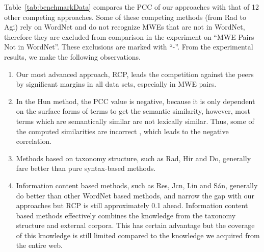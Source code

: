 Table~\ref{tab:benchmarkData} compares the PCC of our approaches with that of 12 other competing approaches.
Some of these competing methods (from Rad to Agi) rely on WordNet and
do not recognize MWEs that are not in WordNet, therefore they are
excluded from comparison in the experiment on ``MWE Pairs Not in WordNet''.
These exclusions are marked with ``-''.
From the experimental results, we make the following observations.
\begin{enumerate}
\item Our most advanced approach, RCP, leads the competition
against the peers by significant margins in all data sets,
especially in MWE pairs.
\item In the Hun method, the PCC value is negative,
because it is only dependent on the
surface forms of terms to get the semantic similarity,
however, most terms which are
semantically similar are not lexically similar.
Thus, some of the computed similarities are incorrect , which leads
to the negative correlation.
\item Methods based on taxonomy structure, such as Rad, Hir and Do,
generally fare better than pure syntax-based methods.
\item Information content based methods, such as
Res, Jcn, Lin and S\'{a}n, generally do better than other WordNet based
methods, and narrow the gap with our approaches but RCP
is still approximately 0.1 ahead. Information content based methods
effectively combines the knowledge from the taxonomy structure
and external corpora. This has certain advantage but the coverage of
this knowledge is still limited compared to the knowledge we acquired
from the entire web.

\end{enumerate}
